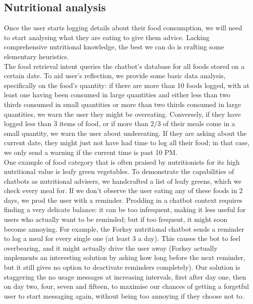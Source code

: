 \subsection{Nutritional analysis}
Once the user starts logging details about their food consumption, we will need to start analysing what they are eating to give them advice. Lacking comprehensive nutritional knowledge, the best we can do is crafting some elementary heuristics. \\
The food retrieval intent queries the chatbot's database for all foods stored on a certain date. To aid user's reflection, we provide some basic data analysis, specifically on the food's quantity: if there are more than 10 foods logged, with at least one having been consumed in large quantities and either less than two thirds consumed in small quantities or more than two thirds consumed in large quantities, we warn the user they might be overeating. Conversely, if they have logged less than 3 items of food, or if more than $2/3$ of their meals come in a small quantity, we warn the user about undereating. If they are asking about the current date, they might just not have had time to log all their food; in that case, we only send a warning if the current time is past 10 PM.\\
One example of food category that is often praised by nutritionists for its high nutritional value \cite{} is leafy green vegetables. To demonstrate the capabilities of chatbots as nutritional advisers, we handcrafted a list of leafy greens, which we check every meal for. If we don't observe the user eating any of these foods in 2 days, we prod the user with a reminder. Prodding in a chatbot context requires finding a very delicate balance: it can be too infrequent, making it less useful for users who actually want to be reminded; but if too frequent, it  might soon become annoying. For example, the Forksy nutritional chatbot \cite{} sends a reminder to log a meal for every single one (at least 3 a day). This causes the bot to feel overbearing, and it might actually drive the user away (Forksy actually implements an interesting solution by asking how long before the next reminder, but it still gives no option to deactivate reminders completely). Our solution is staggering the no usage messages at increasing intervals, first after day one, then on day two, four, seven and fifteen, to maximise our chances of getting a forgetful user to start messaging again, without being too annoying if they choose not to.


